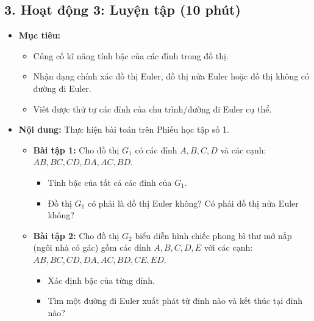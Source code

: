 \documentclass[12pt, a4paper]{article}
\begin{document}
\subsection*{3. Hoạt động 3: Luyện tập (10 phút)}

\begin{itemize}[leftmargin=1.2cm]
    \item[a)] \textbf{Mục tiêu:}
    \begin{itemize}[leftmargin=0.6cm]
        \item Củng cố kĩ năng tính bậc của các đỉnh trong đồ thị.
        \item Nhận dạng chính xác đồ thị Euler, đồ thị nửa Euler hoặc đồ thị không có đường đi Euler.
        \item Viết được thứ tự các đỉnh của chu trình/đường đi Euler cụ thể.
    \end{itemize}

    \item[b)] \textbf{Nội dung:} Thực hiện bài toán trên Phiếu học tập số 1.
    \begin{itemize}[leftmargin=0.6cm]
        \item \textbf{Bài tập 1:} Cho đồ thị $G_1$ có các đỉnh $A, B, C, D$ và các cạnh: $AB, BC, CD, DA, AC, BD$.
        \begin{itemize}
            \item Tính bậc của tất cả các đỉnh của $G_1$.
            \item Đồ thị $G_1$ có phải là đồ thị Euler không? Có phải đồ thị nửa Euler không?
        \end{itemize}
        \item \textbf{Bài tập 2:} Cho đồ thị $G_2$ biểu diễn hình chiếc phong bì thư mở nắp (ngôi nhà có gác) gồm các đỉnh $A, B, C, D, E$ với các cạnh: $AB, BC, CD, DA, AC, BD, CE, ED$.
        \begin{itemize}
            \item Xác định bậc của từng đỉnh.
            \item Tìm một đường đi Euler xuất phát từ đỉnh nào và kết thúc tại đỉnh nào?
        \end{itemize}
    \end{itemize}


\end{itemize}
\end{document}
